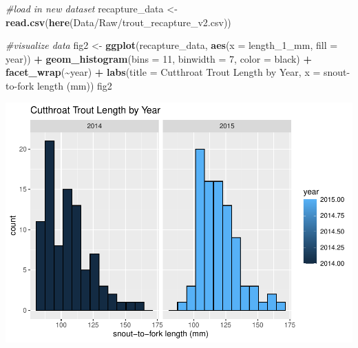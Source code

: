 \documentclass[
]{article}
\newenvironment{Shaded}{\begin{snugshade}}{\end{snugshade}}
\newcommand{\AttributeTok}[1]{\textcolor[rgb]{0.13,0.29,0.53}{#1}}
\newcommand{\CommentTok}[1]{\textcolor[rgb]{0.56,0.35,0.01}{\textit{#1}}}
\newcommand{\DecValTok}[1]{\textcolor[rgb]{0.00,0.00,0.81}{#1}}
\newcommand{\FunctionTok}[1]{\textcolor[rgb]{0.13,0.29,0.53}{\textbf{#1}}}
\newcommand{\NormalTok}[1]{#1}
\newcommand{\OtherTok}[1]{\textcolor[rgb]{0.56,0.35,0.01}{#1}}
\newcommand{\SpecialCharTok}[1]{\textcolor[rgb]{0.81,0.36,0.00}{\textbf{#1}}}
\newcommand{\StringTok}[1]{\textcolor[rgb]{0.31,0.60,0.02}{#1}}
\begin{document}
\begin{Shaded}
\begin{Highlighting}[]
\CommentTok{\#load in new dataset}
\NormalTok{recapture\_data }\OtherTok{\textless{}{-}} \FunctionTok{read.csv}\NormalTok{(}\FunctionTok{here}\NormalTok{(}\StringTok{\textquotesingle{}Data/Raw/trout\_recapture\_v2.csv\textquotesingle{}}\NormalTok{))}

\CommentTok{\#visualize data}
\NormalTok{fig2 }\OtherTok{\textless{}{-}} \FunctionTok{ggplot}\NormalTok{(recapture\_data, }\FunctionTok{aes}\NormalTok{(}\AttributeTok{x =}\NormalTok{ length\_1\_mm, }\AttributeTok{fill =}\NormalTok{ year)) }\SpecialCharTok{+}
  \FunctionTok{geom\_histogram}\NormalTok{(}\AttributeTok{bins =} \DecValTok{11}\NormalTok{, }\AttributeTok{binwidth =} \DecValTok{7}\NormalTok{, }\AttributeTok{color =} \StringTok{\textquotesingle{}black\textquotesingle{}}\NormalTok{) }\SpecialCharTok{+}
  \FunctionTok{facet\_wrap}\NormalTok{(}\SpecialCharTok{\textasciitilde{}}\NormalTok{year) }\SpecialCharTok{+}
  \FunctionTok{labs}\NormalTok{(}\AttributeTok{title =} \StringTok{\textquotesingle{}Cutthroat Trout Length by Year\textquotesingle{}}\NormalTok{, }
       \AttributeTok{x =} \StringTok{\textquotesingle{}snout{-}to{-}fork length (mm)\textquotesingle{}}\NormalTok{)}
\NormalTok{fig2}
\end{Highlighting}
\end{Shaded}

\includegraphics{Lab7_Summer.Heschong_files/figure-latex/Wilcoxon Signed-Rank test-1.pdf}
\end{document}
